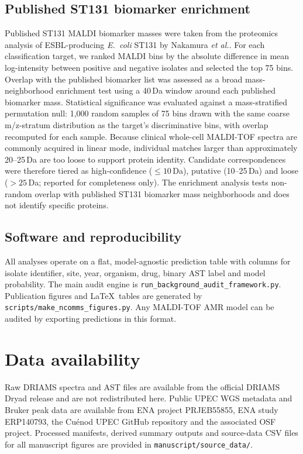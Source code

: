 \documentclass[11pt]{article}
\begin{document}
\subsection*{Published ST131 biomarker enrichment}

Published ST131 MALDI biomarker masses were taken from the proteomics analysis of ESBL-producing \textit{E.~coli} ST131 by Nakamura \textit{et al.}\cite{nakamura2019st131}. For each classification target, we ranked MALDI bins by the absolute difference in mean log-intensity between positive and negative isolates and selected the top 75 bins. Overlap with the published biomarker list was assessed as a broad mass-neighborhood enrichment test using a 40\,Da window around each published biomarker mass. Statistical significance was evaluated against a mass-stratified permutation null: 1,000 random samples of 75 bins drawn with the same coarse m/z-stratum distribution as the target's discriminative bins, with overlap recomputed for each sample. Because clinical whole-cell MALDI-TOF spectra are commonly acquired in linear mode, individual matches larger than approximately 20--25\,Da are too loose to support protein identity. Candidate correspondences were therefore tiered as high-confidence ($\leq 10$\,Da), putative (10--25\,Da) and loose ($>25$\,Da; reported for completeness only). The enrichment analysis tests non-random overlap with published ST131 biomarker mass neighborhoods and does not identify specific proteins.

\subsection*{Software and reproducibility}

All analyses operate on a flat, model-agnostic prediction table with columns for isolate identifier, site, year, organism, drug, binary AST label and model probability. The main audit engine is \texttt{run\_background\_audit\_framework.py}. Publication figures and \LaTeX\ tables are generated by \texttt{scripts/make\_ncomms\_figures.py}. Any MALDI-TOF AMR model can be audited by exporting predictions in this format.

\section*{Data availability}

Raw DRIAMS spectra and AST files are available from the official DRIAMS Dryad release\cite{driamsdryad} and are not redistributed here. Public UPEC WGS metadata and Bruker peak data are available from ENA project PRJEB55855, ENA study ERP140793, the Cu\'{e}nod UPEC GitHub repository and the associated OSF project. Processed manifests, derived summary outputs and source-data CSV files for all manuscript figures are provided in \texttt{manuscript/source\_data/}.
\end{document}
